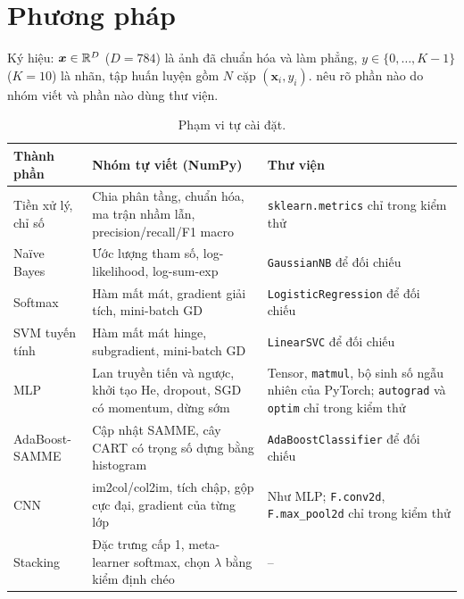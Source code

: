 \section{Phương pháp}
\label{sec:methods}
Ký hiệu: $\bm x\in\mathbb{R}^{D}$ ($D=784$) là ảnh đã chuẩn hóa và làm phẳng, $y\in\{0,\dots,K-1\}$ ($K=10$) là nhãn, tập huấn luyện gồm $N$ cặp $(\bm x_i,y_i)$.  nêu rõ phần nào do nhóm viết và phần nào dùng thư viện.

\begin{table}[tbp]
\centering\small
\begin{tabular}{@{}p{2.5cm}p{6.6cm}p{5.2cm}@{}}
\toprule
Thành phần & Nhóm tự viết (NumPy) & Thư viện \\
\midrule
Tiền xử lý, chỉ số & Chia phân tầng, chuẩn hóa, ma trận nhầm lẫn, precision/recall/F1 macro & \texttt{sklearn.metrics} chỉ trong kiểm thử \\
Naïve Bayes & Ước lượng tham số, log-likelihood, log-sum-exp & \texttt{GaussianNB} để đối chiếu \\
Softmax & Hàm mất mát, gradient giải tích, mini-batch GD & \texttt{LogisticRegression} để đối chiếu \\
SVM tuyến tính & Hàm mất mát hinge, subgradient, mini-batch GD & \texttt{LinearSVC} để đối chiếu \\
MLP & Lan truyền tiến và ngược, khởi tạo He, dropout, SGD có momentum, dừng sớm & Tensor, \texttt{matmul}, bộ sinh số ngẫu nhiên của PyTorch; \texttt{autograd} và \texttt{optim} chỉ trong kiểm thử \\
AdaBoost-SAMME & Cập nhật SAMME, cây CART có trọng số dựng bằng histogram & \texttt{AdaBoostClassifier} để đối chiếu \\
CNN & im2col/col2im, tích chập, gộp cực đại, gradient của từng lớp & Như MLP; \texttt{F.conv2d}, \texttt{F.max\_pool2d} chỉ trong kiểm thử \\
Stacking & Đặc trưng cấp 1, meta-learner softmax, chọn $\lambda$ bằng kiểm định chéo & -- \\
\bottomrule
\end{tabular}
\caption{Phạm vi tự cài đặt.}
\label{tab:scope}
\end{table}

